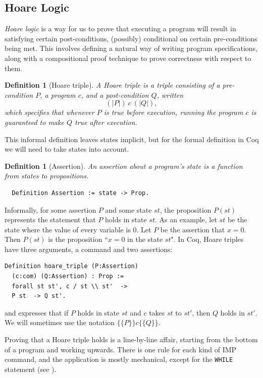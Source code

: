 \documentclass[compsoc,conference,a4paper,10pt,times]{IEEEtran}
\newtheorem{defin}[theorem]{Definition}
\begin{document}
\subsection{Hoare Logic}
\emph{Hoare logic} is a way for us to prove that executing a program will result in satisfying certain post-conditions, (possibly) conditional on certain pre-conditions being met.  This involves defining a natural way of writing program specifications, along with a compositional proof technique to prove correctness with respect to them.
\begin{defin}[Hoare triple]
	A \emph{Hoare triple} is a triple consisting of a pre-condition $P$, a program $c$, and a post-condition $Q$, written
    \[
    	(| P |)\ c\ (| Q |),
    \]
    which specifies that whenever $P$ is true before execution, running the program $c$ is guaranteed to make $Q$ true after execution.  
\end{defin}
This informal definition leaves states implicit, but for the formal definition in Coq we will need to take states into account.

\begin{defin}[Assertion]
An \emph{assertion} about a program's state is a function from states to propositions.
\begin{verbatim}   
  Definition Assertion := state -> Prop.
\end{verbatim}
\end{defin}
Informally, for some assertion $P$ and some state $st$, the proposition $P(st)$ represents the statement that $P$ holds in state $st$.  
As an example, let $st$ be the state where the value of every variable is 0.  Let $P$ be the assertion that $x=0$.  Then $P(st)$ is the proposition ``$x = 0$ in the state $st$".  In Coq, Hoare triples have three arguments, a command and two assertions:
\begin{verbatim}
Definition hoare_triple (P:Assertion)
  (c:com) (Q:Assertion) : Prop :=
  forall st st', c / st \\ st'  ->
  P st  -> Q st'.
\end{verbatim}
and expresses that if $P$ holds in state $st$ and $c$ takes $st$ to $st'$, then $Q$ holds in $st'$.  We will sometimes use the notation $\{\{P\}\}c\{\{Q\}\}$.

Proving that a Hoare triple holds is a line-by-line affair, starting from the bottom of a program and working upwards.  There is one rule for each kind of IMP command, and the application is mostly mechanical, except for the \texttt{WHILE} statement (see \cite{SFV2}).
\end{document}

